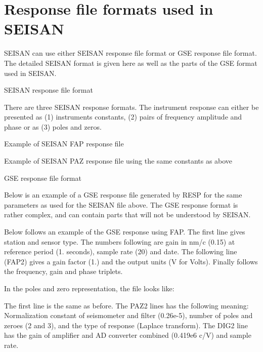 \chapter{Response file formats used in SEISAN}
\label{app:response}

SEISAN can use either SEISAN response file format or GSE response file format.  The detailed SEISAN format is given here as well as the parts of the GSE format used in SEISAN. 

SEISAN response file format 

There are three SEISAN response formats. The instrument response can either be presented as (1) instruments constants, (2) pairs of frequency amplitude and phase or as (3) poles and zeros. 



Example of SEISAN FAP response file 



Example of SEISAN PAZ response file using the same constants as above 



GSE response file format 

Below is an example of a GSE response file generated by RESP for the same parameters as used for the SEISAN file above. The GSE response format is rather complex, and can contain parts that will not be understood by SEISAN. 

Below follows an example of the GSE response using FAP. The first line gives station and sensor type. The numbers following are gain in nm/c (0.15) at reference period (1. seconds), sample rate 
(20) and date. The following line (FAP2) gives a gain factor (1.) and the output units (V for Volts). Finally follows the frequency, gain and phase triplets. 



In the poles and zero representation, the file looks like: 



The first line is the same as before. The PAZ2 lines has the following meaning: Normalization constant of seismometer and filter (0.26e-5), number of poles and zeroes (2 and 3), and the type of response (Laplace transform). The DIG2 line has the gain of amplifier and AD converter combined (0.419e6 c/V) and sample rate. 

